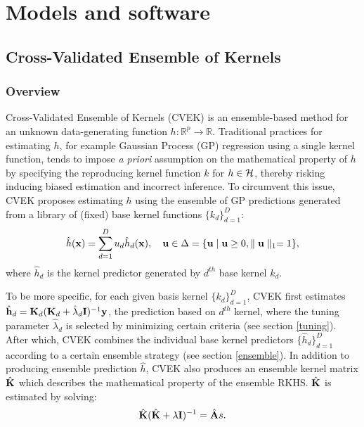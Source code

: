 \documentclass[article]{jss}
\begin{document}


\section{Models and software} \label{sec:models}

\subsection{Cross-Validated Ensemble of Kernels}
\setcounter{equation}{0}
\renewcommand{\theequation}{2.1.\arabic{equation}}
\subsubsection{{Overview}}

Cross-Validated Ensemble of Kernels (CVEK) \citep{liu_robust_2017} is an ensemble-based method for an unknown data-generating function $h: \mathbb{R}^p\rightarrow \mathbb{R}$. Traditional practices for estimating $h$, for example  Gaussian Process (GP) regression using a single kernel function, tends to impose \emph{a priori} assumption on the mathematical property of $h$ by specifying the reproducing kernel function $k$ for $h \in {\cal H}$, thereby risking inducing biased estimation and incorrect inference. To circumvent this issue, CVEK proposes estimating $h$ using the ensemble of GP predictions generated from a library of (fixed) base kernel functions $\{k_d\}_{d=1}^D$:
\begin{align}
\hat{h}({\bf x})=\sum_{d=1}^D u_d\hat{h}_d({\bf x}), \quad {\bf u} \in \Delta=\{{\bf u} \mid {\bf u} \geq 0, \parallel {\bf u} \parallel_1=1\},
\end{align}
where $\hat{h}_d$ is the kernel predictor generated by $d^{th}$ base kernel $k_d$.

To be more specific, for each given basis kernel $\{k_d\}_{d=1}^D$, CVEK first estimates $\hat{{\bf h}}_d={\bf K}_d({\bf K}_d+\hat{\lambda}_d{\bf I})^{-1}{\bf y}$, the prediction based on $d^{th}$ kernel, where the tuning parameter $\hat{\lambda}_d$ is selected by minimizing certain criteria (see section \ref{tuning}). After which, CVEK combines the individual base kernel predictors $\{\hat{h}_d\}_{d=1}^D$ according to a certain ensemble strategy (see section \ref{ensemble}). In addition to producing ensemble prediction $\hat{h}$, CVEK also produces an ensemble kernel matrix $\hat{{\bf K}}$ which describes the mathematical property of the ensemble RKHS. $\hat{{\bf K}}$ is estimated by solving:
\begin{align*}
\hat{{\bf K}}(\hat{{\bf K}}+\lambda {\bf I})^{-1}=\hat{{\bf A}}s.
\end{align*}
\end{document}
